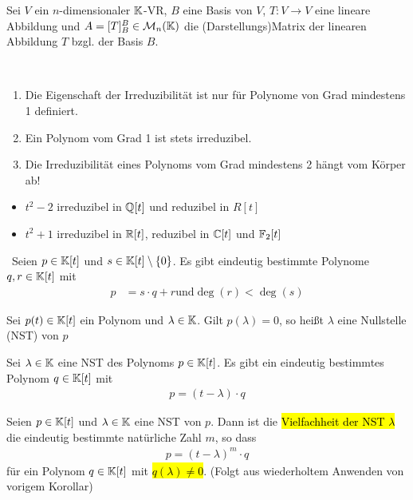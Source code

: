 Sei $V$ ein $n$-dimensionaler $\mathbb{K}$-VR, $B$ eine Basis von $V$, $T:V\to V$ eine lineare Abbildung und $A=[T]_B^B\in \mathcal{M}_n(\mathbb{K})$ die (Darstellungs)Matrix der linearen Abbildung $T$ bzgl. der Basis $B$.

\begin{remark}\,
\begin{enumerate}
    \item Die Eigenschaft der Irreduzibilität ist nur für Polynome von Grad mindestens 1 definiert.
    \item Ein Polynom vom Grad 1 ist stets irreduzibel.
    \item Die Irreduzibilität eines Polynoms vom Grad mindestens 2 hängt vom Körper ab!
\end{enumerate}
\begin{itemize}
    \item $t^2-2$ irreduzibel in $\mathbb{Q}[t]$ und reduzibel in $R[t]$
    \item $t^2+1$ irreduzibel in $\mathbb{R}[t]$, reduzibel in $\mathbb{C}[t]$ und $\mathbb{F}_2[t]$
\end{itemize}
\end{remark}

\begin{theorem}[Polynomdivision]\,
Seien $p\in\mathbb{K}[t]$ und $s\in\mathbb{K}[t]\setminus\{0\}$. 
Es gibt eindeutig bestimmte Polynome $q,r\in\mathbb{K}[t]$ mit
\begin{align*}
    p&=s\cdot q+r \text{und} \deg(r)<\deg(s)
\end{align*}
\end{theorem}

\begin{definition}
Sei $p(t)\in\mathbb{K}[t]$ ein Polynom und $\lambda\in\mathbb{K}$. Gilt $p(\lambda)=0$, so heißt $\lambda$ eine Nullstelle (NST) von $p$
\end{definition}

\begin{corollary}
Sei $\lambda\in\mathbb{K}$ eine NST des Polynoms $p\in\mathbb{K}[t]$.
Es gibt ein eindeutig bestimmtes Polynom $q\in\mathbb{K}[t]$ mit
\begin{align*}
    p=(t-\lambda)\cdot q
\end{align*}
\end{corollary}

\begin{definition}
Seien $p\in\mathbb{K}[t]$ und $\lambda\in\mathbb{K}$ eine NST von $p$.
Dann ist die \hl{Vielfachheit der NST $\lambda$} die eindeutig bestimmte natürliche Zahl $m$, so dass
\begin{align*}
    p=(t-\lambda)^m\cdot q
\end{align*}
für ein Polynom $q\in\mathbb{K}[t]$ mit \hl{$q(\lambda)\neq0$}.
(Folgt aus wiederholtem Anwenden von vorigem Korollar)
\end{definition}

